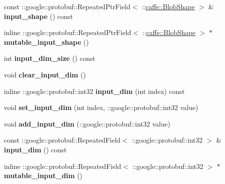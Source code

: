 \begin{DoxyCompactItemize}
const \+::google\+::protobuf\+::\+Repeated\+Ptr\+Field$<$ \+::\mbox{\hyperlink{classcaffe_1_1_blob_shape}{caffe\+::\+Blob\+Shape}} $>$ \& {\bfseries input\+\_\+shape} () const
\item 
\mbox{\label{classcaffe_1_1_net_parameter_a7247cecbfad822e6bbb120a5a2b900a2}} 
inline \+::google\+::protobuf\+::\+Repeated\+Ptr\+Field$<$ \+::\mbox{\hyperlink{classcaffe_1_1_blob_shape}{caffe\+::\+Blob\+Shape}} $>$ $\ast$ {\bfseries mutable\+\_\+input\+\_\+shape} ()
\item 
\mbox{\label{classcaffe_1_1_net_parameter_a8bc4fee5e3e2c3aa788e7ae9e2399eca}} 
int {\bfseries input\+\_\+dim\+\_\+size} () const
\item 
\mbox{\label{classcaffe_1_1_net_parameter_ac19d5925f177725a97471239b7552407}} 
void {\bfseries clear\+\_\+input\+\_\+dim} ()
\item 
\mbox{\label{classcaffe_1_1_net_parameter_ad48294b139edcbf7f85ecdfee7e5234c}} 
inline \+::google\+::protobuf\+::int32 {\bfseries input\+\_\+dim} (int index) const
\item 
\mbox{\label{classcaffe_1_1_net_parameter_a58304fec01a9ded9e0301de29f71ec74}} 
void {\bfseries set\+\_\+input\+\_\+dim} (int index, \+::google\+::protobuf\+::int32 value)
\item 
\mbox{\label{classcaffe_1_1_net_parameter_a056d33b237e86a871308a2f62a7ef4e3}} 
void {\bfseries add\+\_\+input\+\_\+dim} (\+::google\+::protobuf\+::int32 value)
\item 
\mbox{\label{classcaffe_1_1_net_parameter_af032a1eada0e52116b87a8c6a259afbb}} 
const \+::google\+::protobuf\+::\+Repeated\+Field$<$ \+::google\+::protobuf\+::int32 $>$ \& {\bfseries input\+\_\+dim} () const
\item 
\mbox{\label{classcaffe_1_1_net_parameter_a7bf22fcb0161f0253307e84595c6276f}} 
inline \+::google\+::protobuf\+::\+Repeated\+Field$<$ \+::google\+::protobuf\+::int32 $>$ $\ast$ {\bfseries mutable\+\_\+input\+\_\+dim} ()

\end{DoxyCompactItemize}
